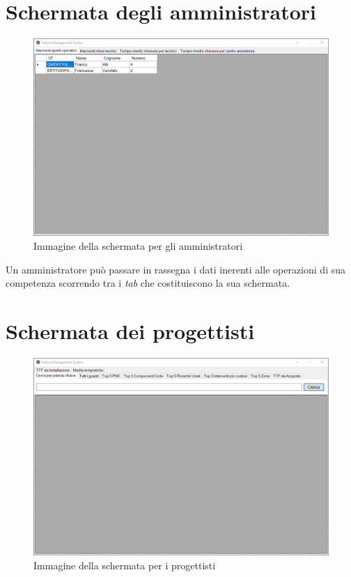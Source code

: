 \documentclass[a4paper, 12pt]{report}
\begin{document}
\section{Schermata degli amministratori}

\begin{figure}[H]
	\centering
	\includegraphics[width=\linewidth]{images/managementScreen.png}
	\caption{Immagine della schermata per gli amministratori}
\end{figure}

Un amministratore può passare in rassegna i dati inerenti alle operazioni di sua competenza scorrendo tra i \textit{tab} che costituiscono la sua schermata.

\section{Schermata dei progettisti}

\begin{figure}[H]
	\centering
	\includegraphics[width=\linewidth]{images/designerScreen.png}
	\caption{Immagine della schermata per i progettisti}
\end{figure}
\end{document}
